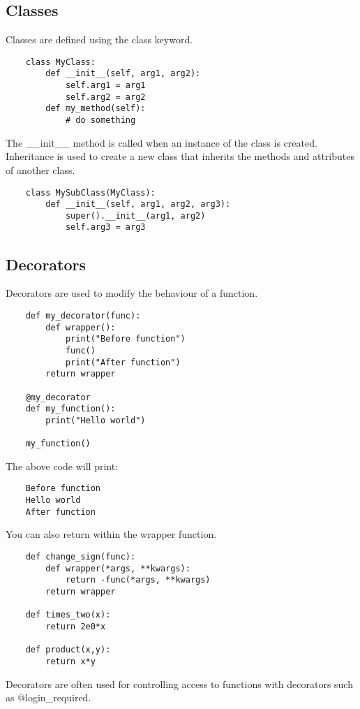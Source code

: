 \documentclass[12pt,a4paper]{article}
\begin{document}
\subsection{Classes}
Classes are defined using the class keyword.\\
\begin{lstlisting}
    class MyClass:
        def __init__(self, arg1, arg2):
            self.arg1 = arg1
            self.arg2 = arg2
        def my_method(self):
            # do something
\end{lstlisting}
The \_\_init\_\_ method is called when an instance of the class is created.\\
Inheritance is used to create a new class that inherits the methods and attributes of another class.\\
\begin{lstlisting}
    class MySubClass(MyClass):
        def __init__(self, arg1, arg2, arg3):
            super().__init__(arg1, arg2)
            self.arg3 = arg3
\end{lstlisting}

\subsection{Decorators}
Decorators are used to modify the behaviour of a function.\\
\begin{lstlisting}
    def my_decorator(func):
        def wrapper():
            print("Before function")
            func()
            print("After function")
        return wrapper

    @my_decorator
    def my_function():
        print("Hello world")

    my_function()
\end{lstlisting}
The above code will print:
\begin{lstlisting}
    Before function
    Hello world
    After function
\end{lstlisting}
You can also return within the wrapper function.\\
\begin{lstlisting}
    def change_sign(func):
        def wrapper(*args, **kwargs):
            return -func(*args, **kwargs)
        return wrapper

    def times_two(x):
        return 2e0*x

    def product(x,y):
        return x*y
\end{lstlisting}
Decorators are often used for controlling access to functions with decorators such as @login\_required.\\
\end{document}

